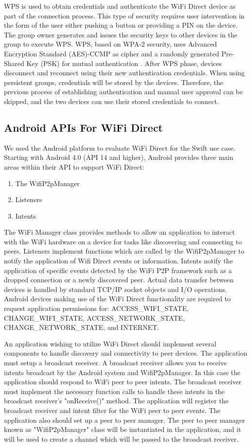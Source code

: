 \documentclass[10pt,twocolumn]{article}
\begin{document}
WPS is used to obtain credentials and authenticate the WiFi Direct device as part of the connection process.  
This type of security requires user intervention in the form of the user either pushing a button or providing a PIN on the device.
The group owner generates and issues the security keys to other devices in the group to execute WPS. 
WPS, based on WPA-2 security, uses Advanced Encryption Standard (AES)-CCMP as cipher and a randomly generated Pre-Shared Key (PSK) for mutual authentication \cite{wifiwhitepaper}.
After WPS phase, devices disconnect and reconnect using their new authentication credentials.
When using persistent groups, credentials will be stored by the devices.
Therefore, the previous process of establishing authentication and manual user approval can be skipped, and the two devices can use their stored credentials to connect.

\subsection{Android APIs For WiFi Direct}
\label{sec:Android APIs For WiFi Direct}
We used the Android platform to evaluate WiFi Direct for the Swift use case.
Starting with Android 4.0 (API 14 and higher), Android provides three main areas within their API to support WiFi Direct:
\begin{enumerate}
\item The WifiP2pManager 
\item Listeners 
\item Intents
\end{enumerate}
The WiFi Manager class provides methods to allow an application to interact with the WiFi hardware on a device for tasks like discovering and connecting to peers. 
Listeners implement functions which are called by the WifiP2pManager to notify the application of Wifi Direct events or information. 
Intents notify the application of specific events detected by the WiFi P2P framework such as a dropped connection or a newly discovered peer. 
Actual data transfer between devices is handled by standard TCP/IP socket objects and I/O operations.
Android devices making use of the WiFi Direct functionality are required to request application permissions for: ACCESS\_WIFI\_STATE, CHANGE\_WIFI\_STATE, ACCESS\_NETWORK\_STATE, CHANGE\_NETWORK\_STATE, and INTERNET. \cite{androidoverview}

An application wishing to utilize WiFi Direct should implement several components to handle discovery and connectivity to peer devices.
The application must setup a broadcast receiver. 
A broadcast receiver allows you to receive intents broadcast by the Android system and WifiP2pManager. 
In this case the application should respond to WiFi peer to peer intents.
The broadcast receiver must implement the necessary function calls to handle these intents in the broadcast receiver's "onReceive()" method.
The application will register the broadcast receiver and intent filter for the WiFi peer to peer events.
The application also should set up a peer to peer manager. 
The peer to peer manager known as "WifiP2pManager" class will be instantiated in the application, and it will be used to create a channel which will be passed to the broadcast receiver.
\end{document}
